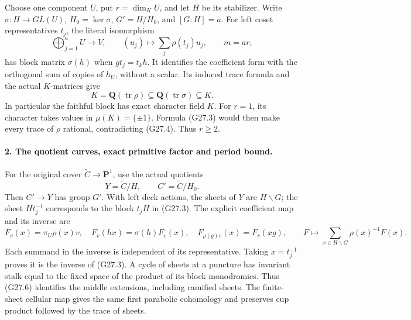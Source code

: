 Choose one component \(U\), put \(r=\dim_KU\), and let
\(H\) be its stabilizer. Write \(\sigma:H\to GL(U)\),
\(H_0=\ker\sigma\), \(G'=H/H_0\), and \([G:H]=a\).
For left coset representatives \(t_j\), the literal isomorphism
\[
 \bigoplus_{j=1}^aU\longrightarrow V,\qquad
       (u_j)\longmapsto\sum_j\rho(t_j)u_j,\qquad m=ar,        \tag{G27.3}
\]
has block matrix \(\sigma(h)\) when \(gt_j=t_kh\).
It identifies the coefficient form with the orthogonal sum of
copies of \(h_U\), without a scalar. Its induced trace formula
and the actual \(K\)-matrices give
\[
 K=\mathbf Q(\operatorname{tr}\rho)
   \subseteq\mathbf Q(\operatorname{tr}\sigma)\subseteq K.
                                                               \tag{G27.4}
\]
In particular the faithful block has exact character field \(K\).
For \(r=1\), its character takes values in \(\mu(K)=\{\pm1\}\).
Formula (G27.3) would then make every trace of \(\rho\) rational,
contradicting (G27.4). Thus \(r\ge2\).

\paragraph{2. The quotient curves, exact primitive factor and period bound.}
For the original cover \(\widetilde C\to\mathbf P^1\), use the
actual quotients
\[
             Y=\widetilde C/H,\qquad C'=\widetilde C/H_0.
                                                               \tag{G27.5}
\]
Then \(C'\to Y\) has group \(G'\). With left deck actions,
the sheets of \(Y\) are \(H\backslash G\); the sheet
\(Ht_j^{-1}\) corresponds to the block \(t_jH\) in (G27.3).
The explicit coefficient map and its inverse are
\[
 F_v(x)=\pi_U\rho(x)v,\quad F_v(hx)=\sigma(h)F_v(x),\quad
 F_{\rho(g)v}(x)=F_v(xg),\qquad
 F\longmapsto\sum_{x\in H\backslash G}\rho(x)^{-1}F(x).
                                                               \tag{G27.6}
\]
Each summand in the inverse is independent of its representative.
Taking \(x=t_j^{-1}\) proves it is the inverse of (G27.3).
A cycle of sheets at a puncture has invariant stalk equal to
the fixed space of the product of its block monodromies.
Thus (G27.6) identifies the middle extensions, including ramified
sheets. The finite-sheet cellular map gives the same first
parabolic cohomology and preserves cup product followed by
the trace of sheets.

